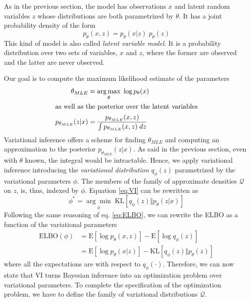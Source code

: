 As in the previous section, the model has observations $x$ and latent random variables $z$ whose distributions are both parametrized by $\theta$. It has a joint probability density of the form
$$p_\theta(x,z)=p_\theta(x|z)\;p_\theta(z)$$
This kind of model is also called \textit{latent variable model}. It is a probability distribution over two sets of variables, $x$ and $z$, where the former are observed and the latter are never observed. 

Our goal is to compute the maximum likelihood estimate of the parameters
\begin{align*}
    \theta_{MLE} &= \underset{\theta}{\arg\max} \; \log p_\theta(x)\\
    \intertext{as well as the posterior over the latent variables}
    p_{\theta_{MLE}}(z|x) &= \frac{p_{\theta_{MLE}}(x,z)}{\int p_{\theta_{MLE}}(x,z)\; dz}
\end{align*}
Variational inference offers a scheme for finding $\theta_{MLE}$ and computing an approximation to the posterior $p_{\theta_{MLE}}(z|x)$. As said in the previous section, even with $\theta$ known, the integral would be intractable. Hence, we apply variational inference introducing the \textit{variational distribution} $q_\phi(z)$ parametrized by the variational parameters $\phi$. The members of the family of approximate densities $\mathcal{Q}$ on $z$, is, thus, indexed by $\phi$. Equation \eqref{eq:VI} can be rewritten as
\begin{equation}
    \phi^* = \underset{\phi}{\arg\min} \; \mathrm{KL}[q_\phi(z) \Vert p_\theta(z|x)]
\end{equation}
Following the same reasoning of eq. \eqref{eq:ELBO}, we can rewrite the ELBO as a function of the variational parameters
\begin{align}
    \mathrm{ELBO}(\phi) &= \mathrm{E}[\log p_\theta(x,z)] - \mathrm{E}[\log q_\phi(z)]\nonumber\\
                &= \mathrm{E}[\log p_\theta(x|z)] - \mathrm{KL} [q_\phi(z)\Vert p_\theta(z)] \label{eq:ELBOphi}
\end{align}
where all the expectations are with respect to $q_\phi(\cdot)$.
Therefore, we can now state that VI turns Bayesian inference into an optimization problem over variational parameters. To complete the specification of the optimization problem, we have to define the family of variational distributions $\mathcal{Q}$. 

